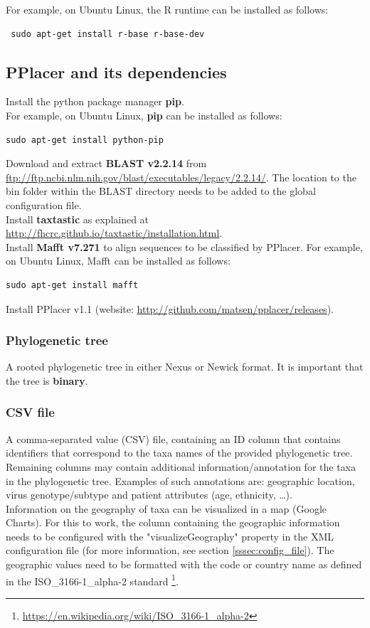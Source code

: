 \documentclass[a4paper, 11pt]{article} %
\begin{document}
\noindent For example, on Ubuntu Linux, the R runtime can be installed as follows:
\begin{verbatim}
 sudo apt-get install r-base r-base-dev
\end{verbatim}

\subsection*{PPlacer and its dependencies}
 Install the python package manager \textbf{pip}. \\

\noindent For example, on Ubuntu Linux, \textbf{pip} can be installed as follows:
\begin{verbatim}
sudo apt-get install python-pip
\end{verbatim}

\noindent Download and extract \textbf{BLAST v2.2.14} from \url{ftp://ftp.ncbi.nlm.nih.gov/blast/executables/legacy/2.2.14/}.
The location to the bin folder within the BLAST directory needs to be added to the global configuration file.\\

\noindent Install \textbf{taxtastic} as explained at \url{http://fhcrc.github.io/taxtastic/installation.html}.\\

\noindent Install \textbf{Mafft v7.271} to align sequences to be classified by PPlacer. 
For example, on Ubuntu Linux, Mafft can be installed as follows:
\begin{verbatim}
sudo apt-get install mafft
\end{verbatim}

\noindent Install PPlacer v1.1 (website: \url{http://github.com/matsen/pplacer/releases}).

\subsubsection*{Phylogenetic tree}
A rooted phylogenetic tree in either Nexus or Newick format. It is important that the tree is \textbf{binary}.

\subsubsection*{CSV file}
A comma-separated value (CSV) file, containing an ID column that contains identifiers that correspond to the taxa names of the provided phylogenetic tree.
Remaining columns may contain additional information/annotation for the taxa in the phylogenetic tree. 
Examples of such annotations are: geographic location, virus genotype/subtype and patient attributes (age, ethnicity, \ldots). \\
Information on the geography of taxa can be visualized in a map (Google Charts). 
For this to work, the column containing the geographic information needs to be configured with the "visualizeGeography" property in the XML configuration file (for more information, see section \ref{sssec:config_file}). 
The geographic values need to be formatted with the code or country name as defined in the ISO\_3166-1\_alpha-2 standard \footnote{\url{https://en.wikipedia.org/wiki/ISO\_3166-1\_alpha-2}}.
\end{document}
